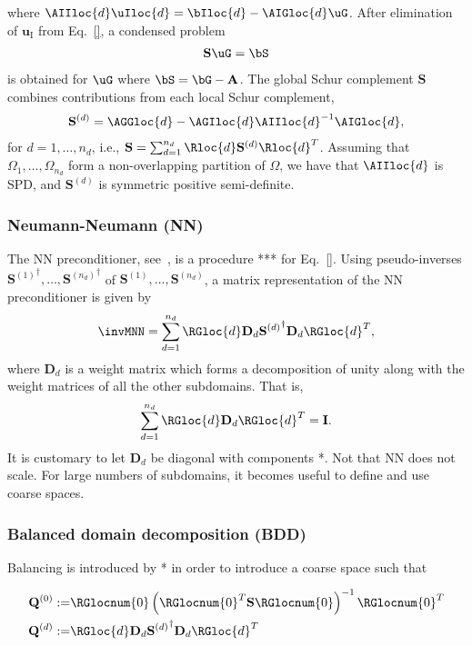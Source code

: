 \documentclass{article}
\begin{document}
where $\AIIloc{d}\uIloc{d}=\bIloc{d}-\AIGloc{d}\uG$.
After elimination of $\mathbf{u}_{\mathrm{I}}$ from Eq.~\eqref{}, a condensed problem
\begin{align}
\mathbf{S}\uG=\bS
\end{align}
is obtained for $\uG$ where $\bS=\bG-\mathbf{A}_{}$.
The global Schur complement $\mathbf{S}$ combines contributions from each local Schur complement,
\begin{align}
\mathbf{S}^{(d)}=
\AGGloc{d}-
\AGIloc{d}\AIIloc{d}^{-1}\AIGloc{d},
\end{align}
for $d=1,\dots,n_d$, i.e., $\mathbf{S}=\sum_{d=1}^{n_d}\Rloc{d}\mathbf{S}^{(d)}\Rloc{d}^T$.
Assuming that $\Omega_1,\dots,\Omega_{n_d}$ form a non-overlapping partition of $\Omega$, we have that $\AIIloc{d}$ is SPD, and $\mathbf{S}^{(d)}$ is symmetric positive semi-definite.

\subsubsection{Neumann-Neumann (NN)}
The NN preconditioner, see~\cite{}, is a procedure *** for Eq.~\eqref{}.
Using pseudo-inverses ${\mathbf{S}^{(1)}}^\dagger,\dots,{\mathbf{S}^{(n_d)}}^\dagger$ of $\mathbf{S}^{(1)},\dots,\mathbf{S}^{(n_d)}$, a matrix representation of the NN preconditioner is given by
\begin{align}
\invMNN=\sum_{d=1}^{n_d}
\RGloc{d}
\mathbf{D}_d
{\mathbf{S}^{(d)}}^\dagger
\mathbf{D}_d
\RGloc{d}^T,
\end{align}
where $\mathbf{D}_d$ is a weight matrix which forms a decomposition of unity along with the weight matrices of all the other subdomains.
That is,
\begin{align}
\sum_{d=1}^{n_d}
\RGloc{d}
\mathbf{D}_d
\RGloc{d}^T
=\mathbf{I}.
\end{align}
It is customary to let $\mathbf{D}_d$ be diagonal with components *.
Not that NN does not scale.
For large numbers of subdomains, it becomes useful to define and use coarse spaces.

\subsubsection{Balanced domain decomposition (BDD)}
Balancing is introduced by * in order to introduce a coarse space such that

\begin{align}
\mathbf{Q}^{(0)}:=&\RGlocnum{0}\left(\RGlocnum{0}^T\mathbf{S}\RGlocnum{0}\right)^{-1}\RGlocnum{0}^T\\
\mathbf{Q}^{(d)}:=&\RGloc{d}\mathbf{D}_d{\mathbf{S}^{(d)}}^\dagger\mathbf{D}_d\RGloc{d}^T
\end{align}
\end{document}
